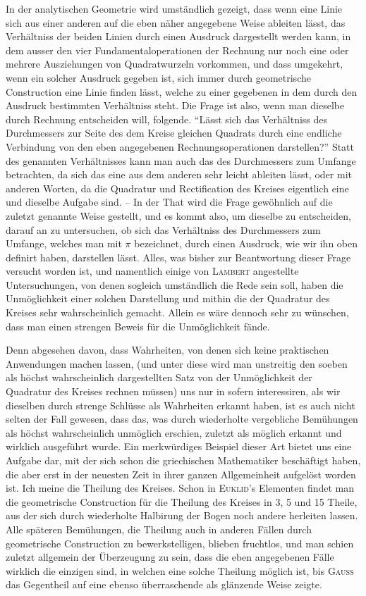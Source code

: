 \documentclass[11pt]{article}
\newcommand{\scn}[1]{\textsc{#1}}
\begin{document}
In der analytischen Geometrie wird umständlich gezeigt, dass wenn eine Linie sich aus einer anderen auf die eben näher angegebene Weise ableiten lässt, das Verhältniss der beiden Linien durch einen Ausdruck dargestellt werden kann, in dem ausser den vier Fundamentaloperationen der Rechnung nur noch eine oder mehrere Ausziehungen von Quadratwurzeln vorkommen, und dass umgekehrt, wenn ein solcher Ausdruck gegeben ist, sich immer durch geometrische Construction eine Linie finden lässt, welche zu einer gegebenen in dem durch den Ausdruck bestimmten Verhältniss steht. Die Frage ist also, wenn man dieselbe durch Rechnung entscheiden will, folgende. ``Lässt sich das Verhältniss des Durchmessers zur Seite des dem Kreise gleichen Quadrats durch eine endliche Verbindung von den eben angegebenen Rechnungsoperationen darstellen?'' Statt des genannten Verhältnisses kann man auch das des Durchmessers zum Umfange betrachten, da sich das eine aus dem anderen sehr leicht ableiten lässt, oder mit anderen Worten, da die Quadratur und Rectification des Kreises eigentlich eine und dieselbe Aufgabe sind. -- In der That wird die Frage gewöhnlich auf die zuletzt genannte Weise gestellt, und es kommt also, um dieselbe zu entscheiden, darauf an zu untersuchen, ob sich das Verhältniss des Durchmessers zum Umfange, welches man mit $\pi$ bezeichnet, durch einen Ausdruck, wie wir ihn oben definirt haben, darstellen lässt. Alles, was bisher zur Beantwortung dieser Frage versucht worden ist, und namentlich einige von \scn{Lambert} angestellte Untersuchungen, von denen sogleich umständlich die Rede sein soll, haben die Unmöglichkeit einer solchen Darstellung und mithin die der Quadratur des Kreises sehr wahrscheinlich gemacht. Allein es wäre dennoch sehr zu wünschen, dass man einen strengen Beweis für die Unmöglichkeit fände.

Denn abgesehen davon, dass Wahrheiten, von denen sich keine praktischen Anwendungen machen lassen, (und unter diese wird man unstreitig den soeben als höchst wahrscheinlich dargestellten Satz von der Unmöglichkeit der Quadratur des Kreises rechnen müssen) uns nur in sofern interessiren, als wir dieselben durch strenge Schlüsse als Wahrheiten erkannt haben, ist es auch nicht selten der Fall gewesen, dass das, was durch wiederholte vergebliche Bemühungen als höchst wahrscheinlich unmöglich erschien, zuletzt als möglich erkannt und wirklich ausgeführt wurde. Ein merkwürdiges Beispiel dieser Art bietet uns eine Aufgabe dar, mit der sich schon die griechischen Mathematiker beschäftigt haben, die aber erst in der neuesten Zeit in ihrer ganzen Allgemeinheit aufgelöst worden ist. Ich meine die Theilung des Kreises. Schon in \scn{Euklid}'s Elementen findet man die geometrische Construction für die Theilung des Kreises in 3, 5 und 15 Theile, aus der sich durch wiederholte Halbirung der Bogen noch andere herleiten lassen. Alle späteren Bemühungen, die Theilung auch in anderen Fällen durch geometrische Construction zu bewerkstelligen, blieben fruchtlos, und man schien zuletzt allgemein der Überzeugung zu sein, dass die eben angegebenen Fälle wirklich die einzigen sind, in welchen eine solche Theilung möglich ist, bis \scn{Gauss} das Gegentheil auf eine ebenso überraschende als glänzende Weise zeigte.
\end{document}
